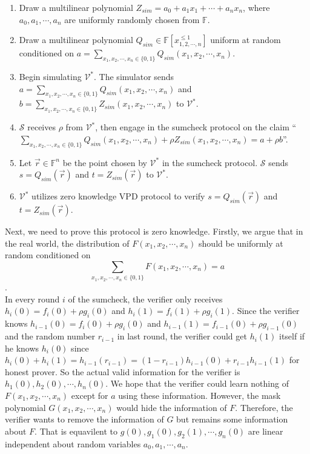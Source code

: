 \begin{enumerate}

\item Draw a multilinear polynomial $Z_{sim} = a_0 + a_1x_1 + \cdots + a_nx_n$, where $a_0, a_1, \cdots, a_n$ are uniformly randomly chosen from $\mathbb{F}$. 

\item Draw a multilinear polynomial $Q_{sim} \in \mathbb{F}[x_{1, 2, \cdots, n}^{\leqslant 1}]$ uniform at random conditioned on $a = \sum\limits_{x_1, x_2, \cdots, x_n \in \{0, 1\}}Q_{sim}(x_1, x_2, \cdots, x_n)$.

\item Begin simulating $\mathcal{V}^*$. The simulator sends $a = \sum\limits_{x_1, x_2, \cdots, x_n \in \{0, 1\}}Q_{sim}(x_1, x_2, \cdots, x_n)$ and $b = \sum\limits_{x_1, x_2, \cdots, x_n \in \{0, 1\}}Z_{sim}(x_1, x_2, \cdots, x_n)$ to $\mathcal{V}^*$. 

\item $\mathcal{S}$ receives $\rho$ from $\mathcal{V^*}$, then engage in the sumcheck protocol on the claim ``$\sum\limits_{x_1, x_2, \cdots, x_n \in \{0, 1\}}Q_{sim}(x_1, x_2, \cdots, x_n) + \rho Z_{sim}(x_1, x_2, \cdots, x_n) = a + \rho b$''. 

\item Let $\vec{r} \in \mathbb{F}^n$ be the point chosen by $\mathcal{V}^*$ in the sumcheck protocol. $\mathcal{S}$ sends $s = Q_{sim}(\vec{r})$ and $t = Z_{sim}(\vec{r})$ to $\mathcal{V^*}$. 

\item $\mathcal{V}^*$ utilizes zero knowledge VPD protocol to verify $s = Q_{sim}(\vec{r})$ and $t = Z_{sim}(\vec{r})$. 

\end{enumerate} 

Next, we need to prove this protocol is zero knowledge. Firstly, we argue that in the real world, the distribution of $F(x_1, x_2, \cdots, x_n)$ should be uniformly at random conditioned on
$$\sum\limits_{x_1, x_2, \cdots, x_n \in \{0, 1\}}F(x_1, x_2, \cdots, x_n) = a$$.\\ 

\noindent
In every round $i$ of the sumcheck, the verifier only receives $h_i(0) = f_i(0) + \rho g_i(0)$ and $h_i(1) = f_i(1) + \rho g_i(1)$. Since the verifier knows $h_{i-1}(0) = f_i(0) + \rho g_i(0)$ and $h_{i-1}(1) = f_{i-1}(0) + \rho g_{i-1}(0)$ and the random number $r_{i-1}$ in last round, the verifier could get $h_{i}(1)$ itself if he knows $h_{i}(0)$ since $h_{i}(0) + h_{i}(1) = h_{i-1}(r_{i-1}) = (1 - r_{i-1})h_{i-1}(0) + r_{i-1}h_{i-1}(1)$ for honest prover. So the actual valid information for the verifier is $h_{1}(0), h_{2}(0), \cdots, h_{n}(0)$. We hope that the verifier could learn nothing of $F(x_1, x_2, \cdots, x_n)$ except for $a$ using these information. However, the mask polynomial $G(x_1, x_2, \cdots, x_n)$ would hide the information of $F$. Therefore, the verifier wants to remove the information of $G$ but remains some information about $F$. That is equavilent to $g(0), g_{1}(0), g_{2}(1), \cdots, g_{n}(0)$ are linear independent about random variables $a_0, a_1, \cdots, a_n$.

